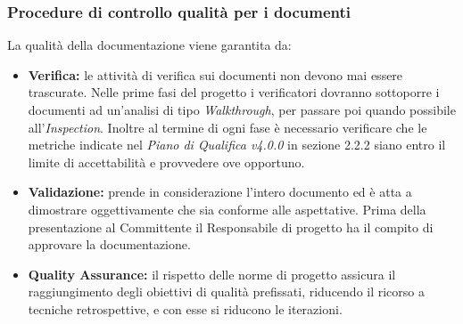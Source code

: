 \documentclass[a4paper]{article}
\begin{document}
		\subsubsection{Procedure di controllo qualità per i documenti}
			La qualità della documentazione viene garantita da:
			\begin{itemize}
				\item \textbf{Verifica:} le attività di verifica sui documenti non devono mai essere trascurate. Nelle prime fasi 
				del progetto i verificatori dovranno sottoporre i documenti ad un'analisi di tipo \emph{Walkthrough}, per passare 
				poi quando possibile all'\emph{Inspection}. Inoltre al termine di ogni fase è necessario verificare che le 
				metriche indicate nel \emph{Piano di Qualifica v4.0.0} in sezione 2.2.2 siano entro il limite di accettabilità e 
				provvedere ove opportuno.
				\item \textbf{Validazione:} prende in considerazione l'intero documento ed è atta a dimostrare oggettivamente che 
				sia conforme alle aspettative. Prima della presentazione al Committente il Responsabile di progetto 
				ha il compito di approvare la documentazione.
				\item \textbf{Quality Assurance:} il rispetto delle norme di progetto assicura il raggiungimento degli obiettivi 
				di qualità prefissati, riducendo il ricorso a tecniche retrospettive, e con esse si riducono le iterazioni.
			\end{itemize}
			
\end{document}
